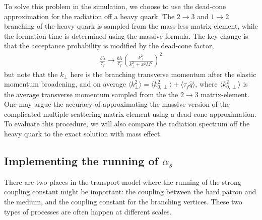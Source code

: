 To solve this problem in the simulation, we choose to use the dead-cone approximation for the radiation off a heavy quark.
The $2\rightarrow 3$ and $1\rightarrow 2$ branching of the heavy quark is sampled from the mass-less matrix-element, while the formation time is determined using the massive formula.
The key change is that the acceptance probability is modified by the dead-cone factor,
\begin{eqnarray}
\frac{b\lambda}{\tau_f} \rightarrow \frac{b\lambda}{\tau_f} \left(\frac{k_\perp^2}{k_\perp^2+x^2M^2}\right)^2
\end{eqnarray}
but note that the $k_\perp$ here is the branching transverse momentum after the elastic momentum broadening, and on average $\langle k_\perp^2 \rangle = \langle k_{0,\perp}^2 \rangle + \langle\tau_f\hat{q}\rangle$, where $\langle k_{0,\perp}^2 \rangle$ is the average transverse momentum sampled from the the $2\rightarrow 3$ matrix-element.
One may argue the accuracy of approximating the massive version of the complicated multiple scattering matrix-element using a dead-cone approximation.
To evaluate this procedure, we will also compare the radiation spectrum off the heavy quark to the exact solution with mass effect.


\subsection{Implementing the running of $\alpha_s$}
There are two places in the transport model where the running of the strong coupling constant might be important:
the coupling between the hard patron and the medium, and the coupling constant for the branching vertices.
These two types of processes are often happen at different scales.

